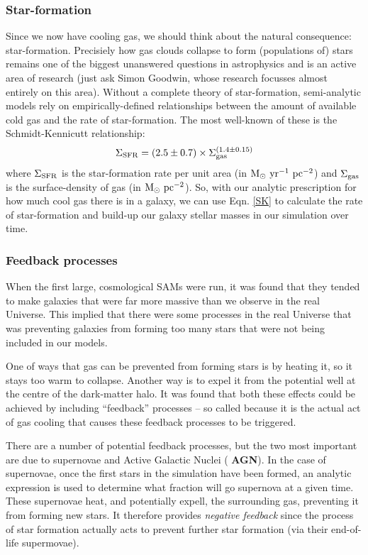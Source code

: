 \documentclass[11pt]{article}
\begin{document}
\subsubsection{Star-formation}
Since we now have cooling gas, we should think about the natural
consequence: star-formation. Precisiely how gas clouds collapse to
form (populations of) stars remains one of the biggest unanswered
questions in astrophysics and is an active area of research (just ask
Simon Goodwin, whose research focusses almost entirely on this
area). Without a complete theory of star-formation, semi-analytic
models rely on empirically-defined relationships between the amount of
available cold gas and the rate of star-formation. The most well-known
of these is the Schmidt-Kennicutt relationship:
\begin{equation}
\label{SK}
\Sigma_{\rm SFR} = (2.5\pm0.7)\times\Sigma_{\rm gas}^{(1.4\pm0.15)}
\end{equation}
where $\Sigma_{\rm SFR}$ is the star-formation rate per unit area (in
${\rm M_\odot~yr^{-1}~pc^{-2}}$) and $\Sigma_{\rm gas}$ is the
surface-density of gas (in ${\rm M_\odot~pc^{-2}}$). So, with our
analytic prescription for how much cool gas there is in a galaxy, we
can use Eqn. \ref{SK} to calculate the rate of star-formation and
build-up our galaxy stellar masses in our simulation over time.

\subsubsection{Feedback processes}
When the first large, cosmological SAMs were run, it was found that
they tended to make galaxies that were far more massive than we
observe in the real Universe. This implied that there were some
processes in the real Universe that was preventing galaxies from
forming too many stars that were not being included in our models.

One of ways that gas can be prevented from forming stars is by heating
it, so it stays too warm to collapse. Another way is to expel it from
the potential well at the centre of the dark-matter halo. It was found
that both these effects could be achieved by including ``feedback''
processes -- so called because it is the actual act of gas cooling
that causes these feedback processes to be triggered.

There are a number of potential feedback processes, but the two most
important are due to supernovae and Active Galactic Nuclei ({\bf
  AGN}). In the case of supernovae, once the first stars in the
simulation have been formed, an analytic expression is used to
determine what fraction will go supernova at a given time. These
supernovae heat, and potentially expell, the surrounding gas,
preventing it from forming new stars. It therefore provides {\it
  negative feedback} since the process of star formation actually acts
to prevent further star formation (via their end-of-life supermovae).
\end{document}
